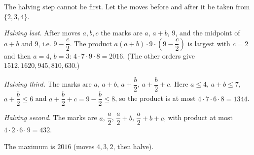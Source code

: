 The halving step cannot be first. Let the moves before and after it be taken from $\{2,3,4\}$.

\emph{Halving last.} After moves $a,b,c$ the marks are $a$, $a+b$, $9$, and the midpoint of $a+b$ and $9$, i.e. $9-\dfrac c2$. The product $a(a+b)\cdot9\cdot\left(9-\dfrac c2\right)$ is largest with $c=2$ and then $a=4$, $b=3$: $4\cdot7\cdot9\cdot8=2016$. (The other orders give $1512,1620,945,810,630$.)

\emph{Halving third.} The marks are $a$, $a+b$, $a+\dfrac b2$, $a+\dfrac b2+c$. Here $a\le4$, $a+b\le7$, $a+\dfrac b2\le 6$ and $a+\dfrac b2+c=9-\dfrac b2\le8$, so the product is at most $4\cdot7\cdot6\cdot8=1344$.

\emph{Halving second.} The marks are $a$, $\dfrac a2$, $\dfrac a2+b$, $\dfrac a2+b+c$, with product at most $4\cdot2\cdot6\cdot9=432$.

The maximum is $\boxed{2016}$ (moves $4,3,2$, then halve).
